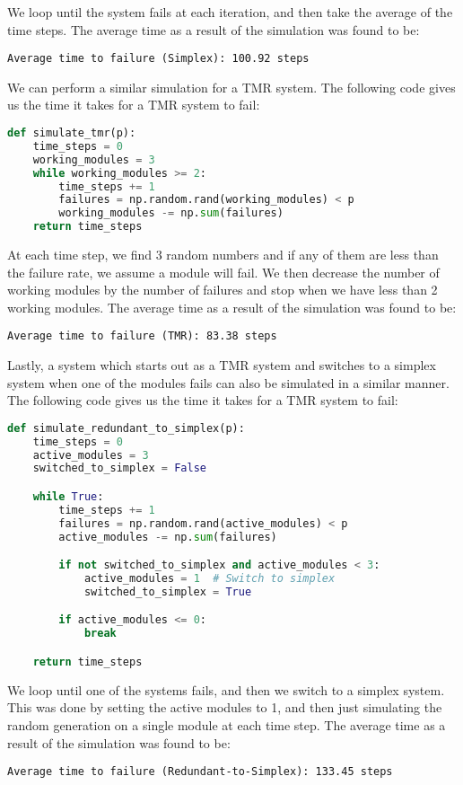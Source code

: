 \documentclass{article}
\begin{document}
We loop until the system fails at each iteration, and then take the average of the time steps. The average time as a result of the simulation was found to be:
\begin{verbatim}
Average time to failure (Simplex): 100.92 steps
\end{verbatim}

We can perform a similar simulation for a TMR system. The following code gives us the time it takes for a TMR system to fail:
\begin{lstlisting}[language=Python, caption={TMR Simulation}, label={lst:python_code}]
def simulate_tmr(p):
    time_steps = 0
    working_modules = 3
    while working_modules >= 2:
        time_steps += 1
        failures = np.random.rand(working_modules) < p
        working_modules -= np.sum(failures)
    return time_steps
\end{lstlisting}

At each time step, we find 3 random numbers and if any of them are less than the failure rate, we assume a module will fail. We then decrease the number of working modules by the number of failures and stop when we have less than 2 working modules. The average time as a result of the simulation was found to be:
\begin{verbatim}
Average time to failure (TMR): 83.38 steps
\end{verbatim}

Lastly, a system which starts out as a TMR system and switches to a simplex system when one of the modules fails can also be simulated in a similar manner. The following code gives us the time it takes for a TMR system to fail:
\begin{lstlisting}[language=Python, caption={Redundant-to-Simplex Simulation}, label={lst:python_code}]
def simulate_redundant_to_simplex(p):
    time_steps = 0
    active_modules = 3
    switched_to_simplex = False

    while True:
        time_steps += 1
        failures = np.random.rand(active_modules) < p
        active_modules -= np.sum(failures)

        if not switched_to_simplex and active_modules < 3:
            active_modules = 1  # Switch to simplex
            switched_to_simplex = True

        if active_modules <= 0:
            break

    return time_steps
\end{lstlisting}

We loop until one of the systems fails, and then we switch to a simplex system. This was done by setting the active modules to 1, and then just simulating the random generation on a single module at each time step. The average time as a result of the simulation was found to be:
\begin{verbatim}
Average time to failure (Redundant-to-Simplex): 133.45 steps
\end{verbatim}
\end{document}

